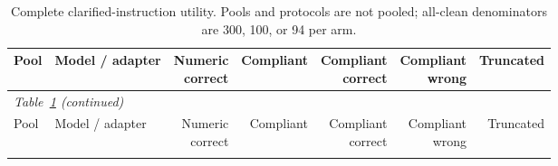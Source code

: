 \documentclass[journal,onecolumn]{IEEEtran}
\begin{document}
\begin{longtable}{@{}llrrrrr@{}}
\caption{Complete clarified-instruction utility. Pools and protocols are not pooled; all-clean denominators are 300, 100, or 94 per arm.}\label{tab:extension-utility}\\
\toprule
Pool & Model / adapter & \shortstack{Numeric\\correct} & Compliant & \shortstack{Compliant\\correct} & \shortstack{Compliant\\wrong} & Truncated\\\midrule
\endfirsthead
\multicolumn{7}{l}{\textit{Table~\ref{tab:extension-utility} (continued)}}\\
\toprule
Pool & Model / adapter & \shortstack{Numeric\\correct} & Compliant & \shortstack{Compliant\\correct} & \shortstack{Compliant\\wrong} & Truncated\\\midrule
\endhead
\bottomrule\endfoot


\end{longtable}
\end{document}
